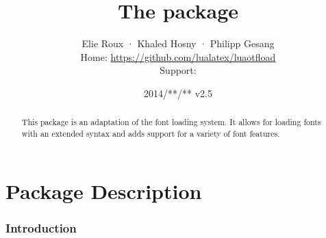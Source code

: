 
\title{The  package}
\date{2014/**/** v2.5}
\author{Elie Roux · Khaled Hosny · Philipp Gesang\\
			 Home:      \url   {https://github.com/lualatex/luaotfload}\\
			 Support:   }

\maketitle

\begin{abstract}
	This package is an adaptation of the \CONTEXT font loading system.
	It allows for loading \OpenType fonts with an extended syntax and adds
	support for a variety of font features.
\end{abstract}


\tableofcontents

\part{Package Description}

\section{Introduction}


